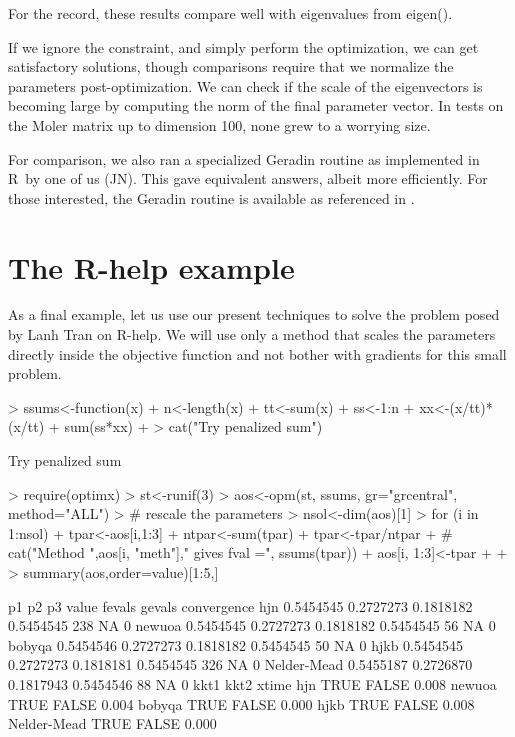 \documentclass[11pt]{article}
\newcommand{\R}{{\sf R}}
\begin{document}
For the record, these results compare well with eigenvalues from eigen().

If we ignore the constraint, and simply perform the optimization, we can
get satisfactory solutions, though comparisons require that we normalize 
the parameters post-optimization. We can check if the scale of the eigenvectors 
is becoming large by computing the norm of the final parameter vector. In 
tests on the Moler matrix up to dimension 100, none grew to a worrying size. 

For comparison, we also ran a specialized Geradin routine as implemented in \R\ by one of 
us (JN). This gave equivalent answers, albeit more efficiently. For those interested, the
Geradin routine is available as referenced in \citep{RQtimes12}.


\section{The R-help example}

As a final example, let us use our present techniques to solve the 
problem posed by Lanh Tran on R-help. We will use
only a method that scales the parameters directly inside the objective function and 
not bother with gradients for this small problem. 

\begin{Schunk}
\begin{Sinput}
> ssums<-function(x){
+   n<-length(x)
+   tt<-sum(x)
+   ss<-1:n
+   xx<-(x/tt)*(x/tt)
+   sum(ss*xx)
+ }
> cat("Try penalized sum\n")
\end{Sinput}
\begin{Soutput}
Try penalized sum
\end{Soutput}
\begin{Sinput}
> require(optimx)
> st<-runif(3)
> aos<-opm(st, ssums, gr="grcentral", method="ALL")
> # rescale the parameters
> nsol<-dim(aos)[1]
> for (i in 1:nsol){ 
+   tpar<-aos[i,1:3] 
+   ntpar<-sum(tpar)
+   tpar<-tpar/ntpar
+ #  cat("Method ",aos[i, "meth"]," gives fval =", ssums(tpar))
+   aos[i, 1:3]<-tpar 
+   
+ }
> summary(aos,order=value)[1:5,]
\end{Sinput}
\begin{Soutput}
                   p1        p2        p3     value fevals gevals convergence
hjn         0.5454545 0.2727273 0.1818182 0.5454545    238     NA           0
newuoa      0.5454545 0.2727273 0.1818182 0.5454545     56     NA           0
bobyqa      0.5454546 0.2727273 0.1818182 0.5454545     50     NA           0
hjkb        0.5454545 0.2727273 0.1818181 0.5454545    326     NA           0
Nelder-Mead 0.5455187 0.2726870 0.1817943 0.5454546     88     NA           0
            kkt1  kkt2 xtime
hjn         TRUE FALSE 0.008
newuoa      TRUE FALSE 0.004
bobyqa      TRUE FALSE 0.000
hjkb        TRUE FALSE 0.008
Nelder-Mead TRUE FALSE 0.000
\end{Soutput}
\end{Schunk}
\end{document}
